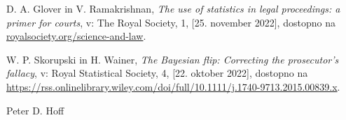 \documentclass[12pt,a4paper]{amsart}
\theoremstyle{definition} %
\theoremstyle{plain} %
\begin{document}
\begin{thebibliography}{99}
        D. A. Glover in V. Ramakrishnan, \emph{The use of statistics in legal proceedings: a primer for courts}, v: The Royal Society, 1, [25. november 2022], dostopno na \url{royalsociety.org/science-and-law}.

        W. P. Skorupski in H. Wainer, \emph{The Bayesian flip: Correcting the prosecutor's fallacy}, v: Royal Statistical Society, 4, [22. oktober 2022], dostopno na \url{https://rss.onlinelibrary.wiley.com/doi/full/10.1111/j.1740-9713.2015.00839.x}.



        Peter D. Hoff

\end{thebibliography}
\end{document}
